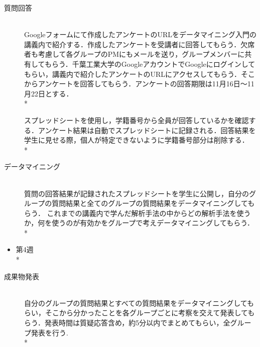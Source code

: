\begin{description}
 \item[質問回答]\mbox{}\\ 
	  Googleフォームにて作成したアンケートのURLをデータマイニング入門の講義内で紹介する．作成したアンケートを受講者に回答してもらう．欠席者も考慮して各グループのPMにもメールを送り，グループメンバーに共有してもらう．千葉工業大学のGoogleアカウントでGoogleにログインしてもらい，講義内で紹介したアンケートのURLにアクセスしてもらう．そこからアンケートを回答してもらう．アンケートの回答期限は11月16日～11月22日とする．\vspace{0.1in} \\*
	  
スプレッドシートを使用し，学籍番号から全員が回答しているかを確認する．アンケート結果は自動でスプレッドシートに記録される．回答結果を学生に見せる際，個人が特定できないように学籍番号部分は削除する．\vspace{0.1in} \\*



\item[データマイニング]\mbox{}\\
	  質問の回答結果が記録されたスプレッドシートを学生に公開し，自分のグループの質問結果と全てのグループの質問結果をデータマイニングしてもらう．
これまでの講義内で学んだ解析手法の中からどの解析手法を使うか，何を使うのが有効かをグループで考えデータマイニングしてもらう．\vspace{0.1in} \\*


\end{description}


\begin{itemize}
 \item 第4週\vspace{0.1in} \\*
\end{itemize}

\begin{description}
 \item[成果物発表]\mbox{}\\ 
	  自分のグループの質問結果とすべての質問結果をデータマイニングしてもらい，そこから分かったことを各グループごとに考察を交えて発表してもらう．発表時間は質疑応答含め，約5分以内でまとめてもらい，全グループ発表を行う. \vspace{0.1in} \\*

\end{description}


